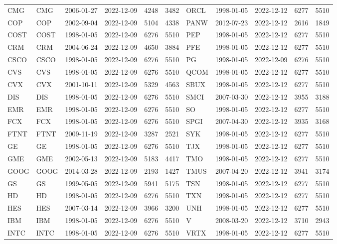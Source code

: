 \begin{table}[ht]
\begin{tabular}{llllrrlllrr}
  CMG & CMG & 2006-01-27 & 2022-12-09 & 4248 & 3482 & ORCL & 1998-01-05 & 2022-12-12 & 6277 & 5510 \\ 
  COP & COP & 2002-09-04 & 2022-12-09 & 5104 & 4338 & PANW & 2012-07-23 & 2022-12-12 & 2616 & 1849 \\ 
  COST & COST & 1998-01-05 & 2022-12-09 & 6276 & 5510 & PEP & 1998-01-05 & 2022-12-12 & 6277 & 5510 \\ 
  CRM & CRM & 2004-06-24 & 2022-12-09 & 4650 & 3884 & PFE & 1998-01-05 & 2022-12-12 & 6277 & 5510 \\ 
  CSCO & CSCO & 1998-01-05 & 2022-12-09 & 6276 & 5510 & PG & 1998-01-05 & 2022-12-09 & 6276 & 5510 \\ 
  CVS & CVS & 1998-01-05 & 2022-12-09 & 6276 & 5510 & QCOM & 1998-01-05 & 2022-12-12 & 6277 & 5510 \\ 
  CVX & CVX & 2001-10-11 & 2022-12-09 & 5329 & 4563 & SBUX & 1998-01-05 & 2022-12-12 & 6277 & 5510 \\ 
  DIS & DIS & 1998-01-05 & 2022-12-09 & 6276 & 5510 & SMCI & 2007-03-30 & 2022-12-12 & 3955 & 3188 \\ 
  EMR & EMR & 1998-01-05 & 2022-12-09 & 6276 & 5510 & SO & 1998-01-05 & 2022-12-12 & 6277 & 5510 \\ 
  FCX & FCX & 1998-01-05 & 2022-12-09 & 6276 & 5510 & SPGI & 2007-04-30 & 2022-12-12 & 3935 & 3168 \\ 
  FTNT & FTNT & 2009-11-19 & 2022-12-09 & 3287 & 2521 & SYK & 1998-01-05 & 2022-12-12 & 6277 & 5510 \\ 
  GE & GE & 1998-01-05 & 2022-12-09 & 6276 & 5510 & TJX & 1998-01-05 & 2022-12-12 & 6277 & 5510 \\ 
  GME & GME & 2002-05-13 & 2022-12-09 & 5183 & 4417 & TMO & 1998-01-05 & 2022-12-12 & 6277 & 5510 \\ 
  GOOG & GOOG & 2014-03-28 & 2022-12-09 & 2193 & 1427 & TMUS & 2007-04-20 & 2022-12-12 & 3941 & 3174 \\ 
  GS & GS & 1999-05-05 & 2022-12-09 & 5941 & 5175 & TSN & 1998-01-05 & 2022-12-12 & 6277 & 5510 \\ 
  HD & HD & 1998-01-05 & 2022-12-09 & 6276 & 5510 & TXN & 1998-01-05 & 2022-12-12 & 6277 & 5510 \\ 
  HES & HES & 2007-03-14 & 2022-12-09 & 3966 & 3200 & UNH & 1998-01-05 & 2022-12-12 & 6277 & 5510 \\ 
  IBM & IBM & 1998-01-05 & 2022-12-09 & 6276 & 5510 & V & 2008-03-20 & 2022-12-12 & 3710 & 2943 \\ 
  INTC & INTC & 1998-01-05 & 2022-12-09 & 6276 & 5510 & VRTX & 1998-01-05 & 2022-12-12 & 6277 & 5510 \\ 

\end{tabular}
\end{table}
